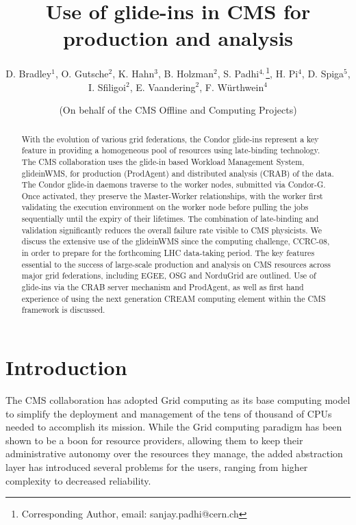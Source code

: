 \documentclass[a4paper]{jpconf}
\begin{document}
\title{Use of glide-ins in CMS for production and analysis}
\author{D. Bradley$^1$, O. Gutsche$^2$, K. Hahn$^3$, B. Holzman$^2$, S. Padhi$^{4,}$\footnote[6]{Corresponding Author, email: sanjay.padhi@cern.ch}, H. Pi$^4$, D. Spiga$^5$, I. Sfiligoi$^2$, E. Vaandering$^2$, F. W\"urthwein$^4$}
\address{$^1$ University of Wisconsin-Madison, Madison, WI, USA}
\address{$^2$ Fermilab, Batavia, IL, USA}
\address{$^3$ Massachusetts Institute of Technology, Cambridge, MA, USA}
\address{$^4$ University of California, San Diego, La Jolla, CA, USA}
\address{$^5$ CERN, CH-1211 Geneva, Switzerland}
\author{(On behalf of the CMS Offline and Computing Projects)}
\begin{abstract}
With the evolution of various grid federations, the Condor glide-ins represent a key feature in providing a homogeneous pool of resources using late-binding technology. The CMS collaboration uses the glide-in based Workload Management System, glideinWMS, for production (ProdAgent) and distributed analysis (CRAB) of the data. The Condor glide-in daemons traverse to the worker nodes, submitted via Condor-G. Once activated, they preserve the Master-Worker relationships, with the worker first validating the execution environment on the worker node before pulling the jobs sequentially until the expiry of their lifetimes. The combination of late-binding and validation significantly reduces the overall failure rate visible to CMS physicists. We discuss the extensive use of the glideinWMS since the computing challenge, CCRC-08, in order to prepare for the forthcoming LHC data-taking period. The key features essential to the success of large-scale production and analysis on CMS resources across major grid federations, including EGEE, OSG and NorduGrid are outlined. Use of glide-ins via the CRAB server mechanism and ProdAgent, as well as first hand experience of using the next generation CREAM computing element within the CMS framework is discussed.
\end{abstract}
\section{Introduction}
The CMS collaboration has adopted Grid computing as its base computing model to simplify the deployment and management of the
tens of thousand of CPUs needed to accomplish its mission.
While the Grid computing paradigm has been shown to be a boon for resource providers, 
allowing them to keep their administrative autonomy over the resources they manage,
the added abstraction layer has introduced several problems for the users, 
ranging from higher complexity to decreased reliability.
\end{document}
